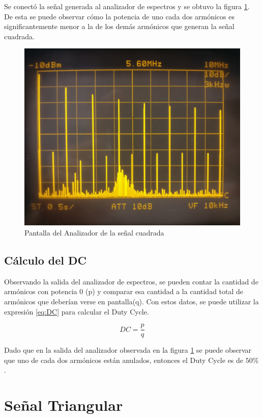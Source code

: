    Se conectó la señal generada al analizador de espectros y se obtuvo la figura \ref{fig:ansr,sqr}.
    De esta se puede observar cómo la potencia de uno cada dos armónicos es significantemente
    menor a la de los demás armónicos que generan la señal cuadrada.

    \begin{figure}[ht]
        \begin{center}
            \includegraphics[width=0.75\linewidth]{contenido/img/espectro_cuadrada.jpg}
            \caption{Pantalla del Analizador de la señal cuadrada}
            \label{fig:ansr,sqr}
        \end{center}
    \end{figure}

    \subsection{Cálculo del DC}
    Observando la salida del analizador de espectros, se pueden contar la cantidad 
    de armónicos con potencia 0 (p) y comparar esa cantidad a la cantidad total de
    armónicos que deberían verse en pantalla(q). Con estos datos, se puede utilizar
    la expresión \ref{eq:DC} para calcular el Duty Cycle.

    \begin{equation}
        DC = \frac{p}{q}
        \label{eq:DC}
    \end{equation}

    Dado que en la salida del analizador observada en la figura \ref{fig:ansr,sqr}
    se puede observar que uno de cada dos armónicos están anulados, entonces el
    Duty Cycle es de $50 \%$.

\section{Señal Triangular}

